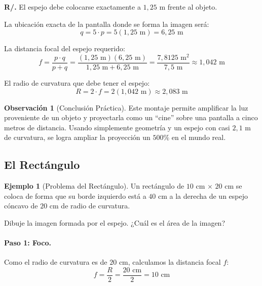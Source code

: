 \documentclass[12pt, a4paper]{article}
\theoremstyle{definition}
\newtheorem{ejemplo}{Ejemplo}[section]
\newtheorem{observacion}{Observación}[section]
\begin{document}
\textbf{R/.} El espejo debe colocarse exactamente a \(1{,}25\) m frente al objeto.

La ubicación exacta de la pantalla donde se forma la imagen será:
\begin{equation}
  q = 5 \cdot p = 5(1{,}25 \text{ m}) = 6{,}25 \text{ m}
  \label{eq:pantalla_q}
\end{equation}

La distancia focal del espejo requerido:
\begin{equation}
  f = \frac{p \cdot q}{p + q} = \frac{(1{,}25 \text{ m})(6{,}25 \text{ m})}{1{,}25 \text{ m} + 6{,}25 \text{ m}} = \frac{7{,}8125 \text{ m}^2}{7{,}5 \text{ m}} \approx 1{,}042 \text{ m}
  \label{eq:pantalla_f}
\end{equation}

El radio de curvatura que debe tener el espejo:
\begin{equation}
  R = 2 \cdot f = 2(1{,}042 \text{ m}) \approx 2{,}083 \text{ m}
  \label{eq:pantalla_R}
\end{equation}

\begin{observacion}[Conclusión Práctica]
Este montaje permite amplificar la luz proveniente de un objeto y proyectarla como un ``cine'' sobre una pantalla a cinco metros de distancia. Usando simplemente geometría y un espejo con casi \(2{,}1\) m de curvatura, se logra ampliar la proyección un \(500\%\) en el mundo real.
\end{observacion}

\subsection{El Rectángulo}

\begin{ejemplo}[Problema del Rectángulo]
Un rectángulo de \(10\) cm \(\times\) \(20\) cm se coloca de forma que su borde izquierdo está a \(40\) cm a la derecha de un espejo cóncavo de \(20\) cm de radio de curvatura.

Dibuje la imagen formada por el espejo. ¿Cuál es el área de la imagen?
\end{ejemplo}

\paragraph{Paso 1: Foco.}
Como el radio de curvatura es de \(20\) cm, calculamos la distancia focal \(f\):
\begin{equation}
  f = \frac{R}{2} = \frac{20 \text{ cm}}{2} = 10 \text{ cm}
  \label{eq:rect_f}
\end{equation}
\end{document}
